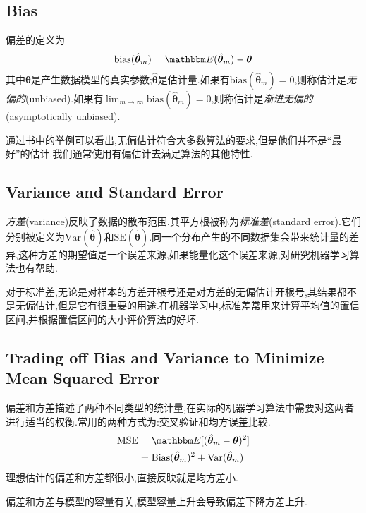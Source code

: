 \subsection{Bias}

偏差的定义为
\begin{equation}
\text{bias}(\hat{\bm\theta}_m)=\mathbbm E(\hat{\bm\theta}_m)-{\bm\theta}
\end{equation}
其中${\bm\theta}$是产生数据模型的真实参数;$\hat{\bm\theta}$是估计量.如果有$\text{bias}(\hat{\bm\theta}_m)=0$,则称估计是\textit{无偏的}(unbiased).如果有$\lim_{m\to\infty}\text{bias}(\hat{\bm\theta}_m)=0$,则称估计是\textit{渐进无偏的}(asymptotically unbiased).

通过书中的举例可以看出,无偏估计符合大多数算法的要求,但是他们并不是``最好''的估计.我们通常使用有偏估计去满足算法的其他特性.

\subsection{Variance and Standard Error}

\textit{方差}(variance)反映了数据的散布范围,其平方根被称为\textit{标准差}(standard error).它们分别被定义为$\text{Var}(\hat{\bm\theta})$和$\text{SE}(\hat{\bm\theta})$.同一个分布产生的不同数据集会带来统计量的差异,这种方差的期望值是一个误差来源,如果能量化这个误差来源,对研究机器学习算法也有帮助.

对于标准差,无论是对样本的方差开根号还是对方差的无偏估计开根号,其结果都不是无偏估计,但是它有很重要的用途.在机器学习中,标准差常用来计算平均值的置信区间,并根据置信区间的大小评价算法的好坏.

\subsection{Trading off Bias and Variance to Minimize Mean Squared Error}

偏差和方差描述了两种不同类型的统计量,在实际的机器学习算法中需要对这两者进行适当的权衡.常用的两种方式为:交叉验证和均方误差比较.
\begin{equation}\begin{split}
\text{MSE}&=\mathbbm E[(\hat{\bm\theta}_m-{\bm\theta})^2]\\
&=\text{Bias}(\hat{\bm\theta}_m)^2+\text{Var}(\hat{\bm\theta}_m)
\end{split}\end{equation}
理想估计的偏差和方差都很小,直接反映就是均方差小.

偏差和方差与模型的容量有关,模型容量上升会导致偏差下降方差上升.

